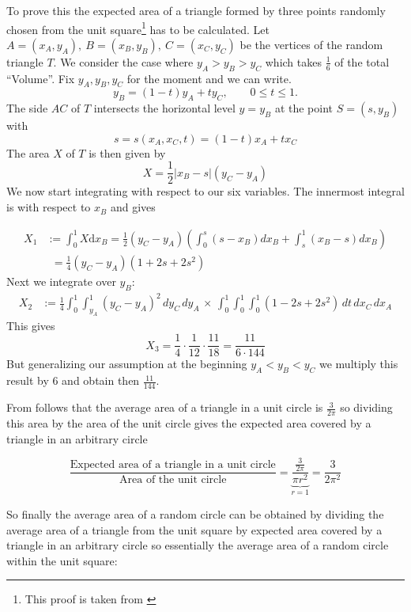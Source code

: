\documentclass[11pt,twoside]{scrreprt}
\begin{document}
To prove this the expected area of a triangle formed by three points randomly chosen from the unit square\footnote{This proof is taken
from \cite{Blatter:2015}} has to be calculated. Let \( A = (x_A, y_A),\ B = (x_B, y_B),\ C = (x_C, y_C)\) be the vertices of the random triangle \( T \). We consider the case where \( y_A
> y_B > y_C \) which takes $\frac{1}{6}$ of the total ``Volume''. Fix \( y_A, y_B, y_C \) for the moment and we can write.
\[
  y_B = (1-t)y_A + ty_C, \qquad 0 \leq t \leq 1.
\]
The side $AC$ of $T$ intersects the horizontal level $y=y_B$ at the point $S=(s,y_B)$ with
\begin{equation}
  s = s(x_A,x_C,t) = (1-t)x_A + tx_C
\end{equation}
The area $X$ of $T$ is then given by
\[
  X = \frac{1}{2}\lvert x_B - s\rvert(y_C - y_A)
\]
We now start integrating with respect to our six variables. The innermost integral is with respect to $x_B$ and gives

\begin{align}
  X_1 &:= \int_0^1X\text{d}x_B=\frac{1}{2}(y_C-y_A)\left( \int_0^s(s-x_B)dx_B + \int_s^1(x_B-s)dx_B\right)\nonumber\\
      &\phantom{:}= \frac{1}{4}(y_C-y_A)(1+2s+2s^2)\nonumber
\end{align}
Next we integrate over $y_B$:
\begin{align}
  X_2 &:= \frac{1}{4}\int_0^1\int_{y_A}^1(y_C-y_A)^2\,dy_C\,dy_A\,\times\,\int_0^1\int_0^1\int_0^1(1-2s+2s^2)\,dt\,dx_C\,dx_A  \nonumber
\end{align}
This gives
\[
  X_3 = \frac{1}{4}\cdot \frac{1}{12} \cdot \frac{11}{18} = \frac{11}{6\cdot144}
\]
But generalizing our assumption at the beginning $y_A < y_B < y_C$ we multiply this result by $6$ and obtain then $\frac{11}{144}$.

From \cite{Weisstein2016} follows that the average area of a triangle in a unit circle is $\frac{3}{2\pi}$ so dividing this area by the
area of the unit circle gives the expected area covered by a triangle in an arbitrary circle

\[
\frac{\text{Expected area of a triangle in a unit circle}}{\text{Area of the unit circle}} = \underbrace{\frac{\frac{3}{2\pi}}{\pi r^2}}_{r=1} = \frac{3}{2\pi^2}
\]

So finally the average area of a random circle can be obtained by dividing the average area of a triangle from the unit square by expected
area covered by a triangle in an arbitrary circle so essentially the average area of a random circle within the unit square:
\end{document}
